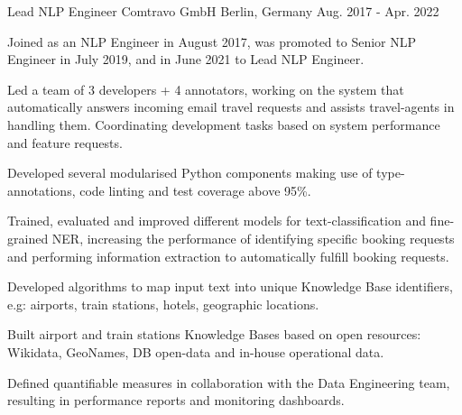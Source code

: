 \begin{cventries}
  \cventry
    {Lead NLP Engineer} %
    {Comtravo GmbH} %
    {Berlin, Germany} %
    {Aug. 2017 - Apr. 2022} %
	{
      \begin{cvitems} %
		\item {Joined as an NLP Engineer in August 2017, was promoted to Senior NLP Engineer in July 2019, and in June 2021 to Lead NLP Engineer.}
        \item {Led a team of 3 developers + 4 annotators, working on the system that automatically answers incoming email travel requests and assists travel-agents in handling them. Coordinating development tasks based on system performance and feature requests.}
        \item {Developed several modularised Python components making use of type-annotations, code linting and test coverage above 95\%.}
        \item {Trained, evaluated and improved different models for text-classification and fine-grained NER, increasing the performance of identifying specific booking requests and performing information extraction to automatically fulfill booking requests.}
		\item {Developed algorithms to map input text into unique Knowledge Base identifiers, e.g: airports, train stations, hotels, geographic locations.}
		\item {Built airport and train stations Knowledge Bases based on open resources: Wikidata, GeoNames, DB open-data and in-house operational data.}
		\item {Defined quantifiable measures in collaboration with the Data Engineering team, resulting in performance reports and monitoring dashboards.}
      \end{cvitems}
    }

\begin{comment}
  \cventry
    {Senior NLP Engineer} %
    {Comtravo GmbH} %
    {} %
    {Aug. 2019 - May 2021} %
	{}

  \cventry
    {NLP Engineer} %
    {Comtravo GmbH} %
    {} %
    {Aug. 2017 - Jul. 2019} %
	{}
\end{comment}


\end{cventries}
